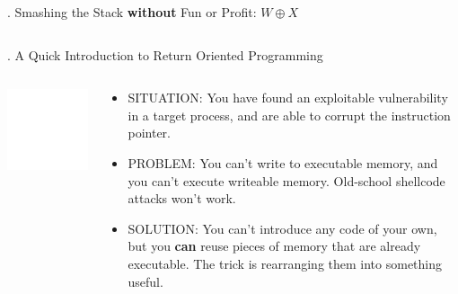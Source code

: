 \documentclass[9pt]{beamer}
\begin{document}
\begin{frame}{\theframenumber. Smashing the Stack \textbf{without} Fun or Profit: $W\oplus X$}
\begin{columns}
\begin{column}{.5\textwidth}
    \end{column}
  \end{columns}
\end{frame}


\begin{frame}{\theframenumber. A Quick Introduction to Return Oriented Programming}
  \begin{columns}
    \begin{column}{.4\textwidth}
      \includegraphics[width=\textwidth]{../images/macgyver-transparent.png}
    \end{column}
    \begin{column}{.6\textwidth}
      \begin{itemize}
      \item<+-> SITUATION: You have found an exploitable vulnerability in a target process, and are able to corrupt the instruction pointer.
        \item<+-> PROBLEM: You can't write to executable memory, and you can't execute writeable memory. Old-school shellcode attacks won't work. 
        \item<+-> SOLUTION: You can't introduce any code of your own, but you \textbf{can} reuse pieces of memory that are already executable. The trick is rearranging them into something useful.
      \end{itemize}
    \end{column}
    \end{columns}
\end{frame}
\end{document}
